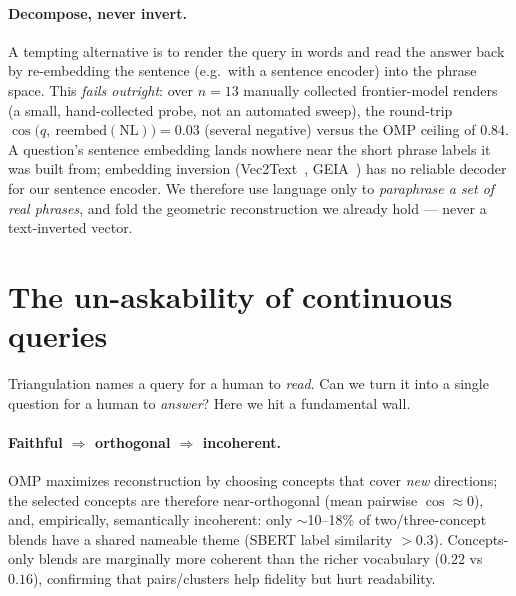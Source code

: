 \documentclass[11pt]{article}
\begin{document}
\paragraph{Decompose, never invert.} A tempting alternative is to render the query in words and read the answer back
by re-embedding the sentence (e.g.\ with a sentence encoder) into the phrase space. This \emph{fails outright}: over
$n{=}13$ manually collected frontier-model renders (a small, hand-collected probe, not an automated sweep), the
round-trip $\cos\big(q,\ \mathrm{reembed}(\mathrm{NL})\big)=0.03$ (several negative) versus the OMP ceiling of $0.84$. A
question's sentence embedding lands nowhere near the short phrase labels it was built from; embedding inversion
(Vec2Text~\citep{vec2text}, GEIA~\citep{geia}) has no reliable decoder for our sentence encoder. We therefore use language only to
\emph{paraphrase a set of real phrases}, and fold the geometric reconstruction we already hold --- never a
text-inverted vector.

\section{The un-askability of continuous queries}\label{sec:unask}
Triangulation names a query for a human to \emph{read}. Can we turn it into a single question for a human to
\emph{answer}? Here we hit a fundamental wall.

\paragraph{Faithful $\Rightarrow$ orthogonal $\Rightarrow$ incoherent.} OMP maximizes reconstruction by choosing
concepts that cover \emph{new} directions; the selected concepts are therefore near-orthogonal (mean pairwise
$\cos\approx 0$), and, empirically, semantically incoherent: only $\sim$10--18\% of two/three-concept blends have a
shared nameable theme (SBERT label similarity $>0.3$). Concepts-only blends are marginally more coherent than the
richer vocabulary ($0.22$ vs $0.16$), confirming that pairs/clusters help fidelity but hurt readability.
\end{document}
